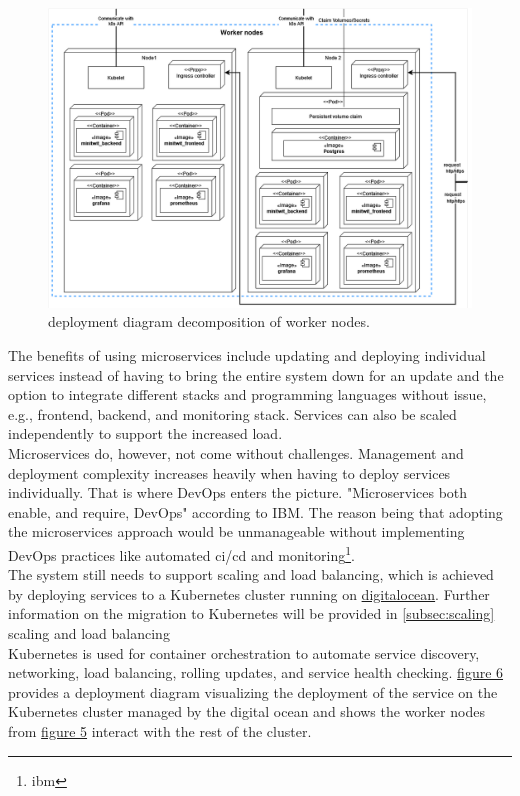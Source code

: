 \begin {figure}[H]
    \centering
    \includegraphics[scale=0.45]{images/deployment_diagrams/devopsdiagrams-deployment worker nodes.drawio(3).png}
    \caption{\mini deployment diagram decomposition of worker nodes.}
    \label{fig:figdeployworker}
\end{figure}
The benefits of using microservices include updating and deploying individual services instead of having to bring the entire system down for an update and the option to integrate different stacks and programming languages without issue, e.g., frontend, backend, and monitoring stack. 
Services can also be scaled independently to support the increased load.\\
Microservices do, however, not come without challenges. 
Management and deployment complexity increases heavily when having to deploy services individually. 
That is where DevOps enters the picture. 
"Microservices both enable, and require, DevOps" according to IBM. 
The reason being that adopting the microservices approach would be unmanageable without implementing DevOps practices like automated ci/cd and monitoring\footnote{ibm\cite{microservices}}.\\
The system still needs to support scaling and load balancing, which is achieved by deploying services to a Kubernetes cluster running on \href{https://www.digitalocean.com/}{digitalocean}. 
Further information on the migration to Kubernetes will be provided in \ref{subsec:scaling} scaling and load balancing \\
Kubernetes is used for container orchestration to automate service discovery, networking, load balancing, rolling updates, and service health checking. \hyperref[fig:figdeploy]{figure 6} provides a deployment diagram visualizing the deployment of the \mini service on the Kubernetes cluster managed by the digital ocean and shows the worker nodes from \hyperref[fig:figdeployworker]{figure 5} interact with the rest of the cluster.
